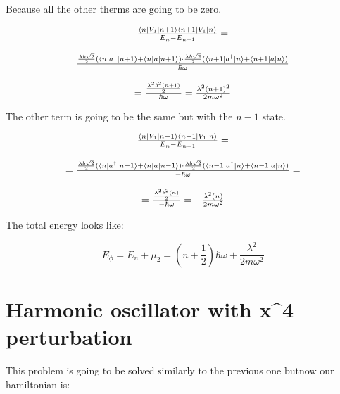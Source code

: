 Because all the other therms are going to be zero.

\begin{equation}
  \begin{array}{c}
    \frac{\langle n\rvert V_1\lvert n+1\rangle\langle n+1\rvert V_1\lvert n\rangle}{E_{n}-E_{n+1}} =
    \\

    \\
    =\frac{\frac{\lambda b \sqrt{2}}{2} (\langle n\rvert a^\dagger\lvert n+1\rangle+\langle n\rvert a\lvert n+1\rangle) \cdot \frac{\lambda b \sqrt{2}}{2} (\langle n+1\rvert a^\dagger\lvert n\rangle+\langle n+1\rvert a\lvert n\rangle)}{\hbar \omega} =
    \\

    \\
    = \frac{\frac{\lambda^2 b^2 (n+1)}{2} }{\hbar \omega} = \frac{\lambda^2 (n+1)^2}{2 m \omega^2}
  \end{array}
\end{equation}

The other term is going to be the same but with the $n-1$ state.

\begin{equation}
  \begin{array}{c}
    \frac{\langle n\rvert V_1\lvert n-1\rangle\langle n-1\rvert V_1\lvert n\rangle}{E_{n}-E_{n-1}} =
    \\

    \\
    =\frac{\frac{\lambda b \sqrt{2}}{2} (\langle n\rvert a^\dagger\lvert n-1\rangle+\langle n\rvert a\lvert n-1\rangle) \cdot \frac{\lambda b \sqrt{2}}{2} (\langle n-1\rvert a^\dagger\lvert n\rangle+\langle n-1\rvert a\lvert n\rangle)}{-\hbar \omega} =
    \\

    \\
    = \frac{\frac{\lambda^2 b^2 (n)}{2} }{-\hbar \omega} = -\frac{\lambda^2 (n)}{2 m \omega^2}
  \end{array}
\end{equation}

The total energy looks like:

\begin{equation}
  E_{\phi} = E_n + \mu_2 = \left(n+\frac{1}{2}\right)\hbar \omega + \frac{\lambda^2}{2m\omega^2}
\end{equation}

\section{Harmonic oscillator with x^4 perturbation}

This problem is going to be solved similarly to the previous one butnow our hamiltonian is:

